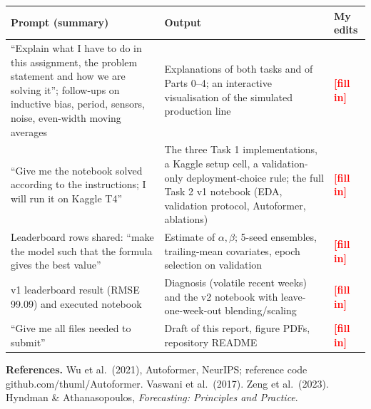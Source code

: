 \documentclass[10.5pt,a4paper]{article}
\newcommand{\fix}[1]{\textcolor{red}{\textbf{[#1]}}}
\begin{document}
\begin{small}
\begin{tabularx}{\linewidth}{>{\raggedright\arraybackslash}p{4.3cm}>{\raggedright\arraybackslash}X>{\raggedright\arraybackslash}p{3.4cm}}\toprule
Prompt (summary) & Output & My edits\\\midrule
``Explain what I have to do in this assignment, the problem statement and how we are solving it''; follow-ups on inductive bias, period, sensors, noise, even-width moving averages & Explanations of both tasks and of Parts 0--4; an interactive visualisation of the simulated production line & \fix{fill in}\\
``Give me the notebook solved according to the instructions; I will run it on Kaggle T4'' & The three Task 1 implementations, a Kaggle setup cell, a validation-only deployment-choice rule; the full Task 2 v1 notebook (EDA, validation protocol, Autoformer, ablations) & \fix{fill in}\\
Leaderboard rows shared: ``make the model such that the formula gives the best value'' & Estimate of $\alpha,\beta$; 5-seed ensembles, trailing-mean covariates, epoch selection on validation & \fix{fill in}\\
v1 leaderboard result (RMSE 99.09) and executed notebook & Diagnosis (volatile recent weeks) and the v2 notebook with leave-one-week-out blending/scaling & \fix{fill in}\\
``Give me all files needed to submit'' & Draft of this report, figure PDFs, repository README & \fix{fill in}\\\bottomrule
\end{tabularx}
\end{small}

\small\textbf{References.} Wu et al.\ (2021), Autoformer, NeurIPS; reference code github.com/thuml/Autoformer. Vaswani et al.\ (2017). Zeng et al.\ (2023). Hyndman \& Athanasopoulos, \emph{Forecasting: Principles and Practice}.
\end{document}

